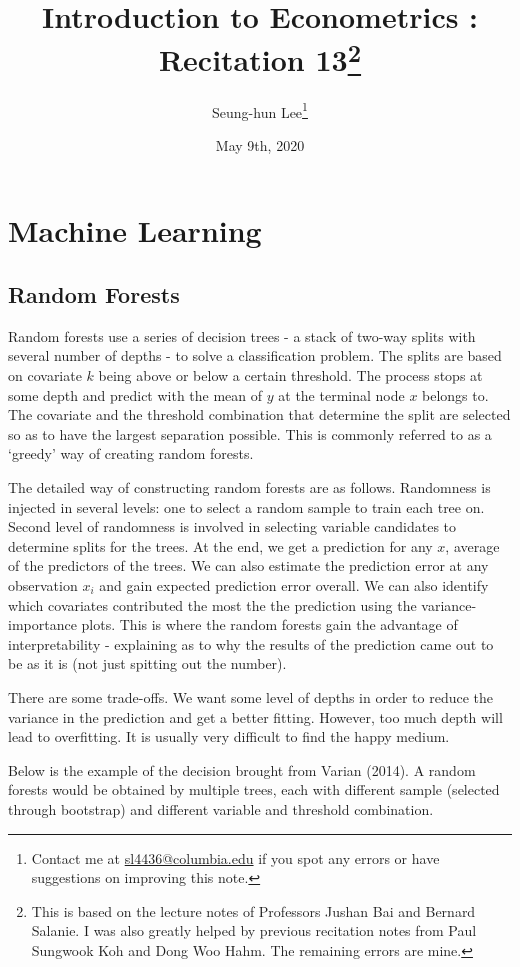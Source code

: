 \documentclass[12pt]{article}
\title{Introduction to Econometrics \ROM{2}: Recitation 13\footnote{This is based on the lecture notes of Professors Jushan Bai and Bernard Salanie. I was also greatly helped by previous recitation notes from Paul Sungwook Koh and Dong Woo Hahm. The remaining errors are mine. }}
\theoremstyle{definition}
\theoremstyle{property}
\theoremstyle{assumption}
\theoremstyle{example}
\theoremstyle{comment}
\begin{document}
\linespread{1.25}
\onehalfspacing

\author{Seung-hun Lee\footnote{Contact me at \href{mailto:sl4436@columbia.edu}{sl4436@columbia.edu} if you spot any errors or have suggestions on improving this note.}}
\date{May 9th, 2020}
\maketitle
\thispagestyle{firstpage}

\section{Machine Learning}
\subsection{Random Forests}
Random forests use a series of decision trees - a stack of two-way splits with several number of depths - to solve a classification problem. The splits are based on covariate $k$ being above or below a certain threshold. The process stops at some depth and predict with the mean of $y$ at the terminal node $x$ belongs to. The covariate and the threshold combination that determine the split are selected so as to have the largest separation possible. This is commonly referred to as a `greedy' way of creating random forests.  \par
The detailed way of constructing random forests are as follows. Randomness is injected in several levels: one to select a random sample to train each tree on. Second level of randomness is involved in selecting variable candidates to determine splits for the trees. At the end, we get a prediction for any $x$, average of the predictors of the trees. We can also estimate the prediction error at any observation $x_i$ and gain expected prediction error overall. We can also identify which covariates contributed the most the the prediction using the variance-importance plots. This is where the random forests gain the advantage of interpretability - explaining as to why the results of the prediction came out to be as it is (not just spitting out the number). \par
There are some trade-offs. We want some level of depths in order to reduce the variance in the prediction and get a better fitting. However, too much depth will lead to overfitting. It is usually very difficult to find the happy medium. \par
Below is the example of the decision brought from Varian (2014). A random forests would be obtained by multiple trees, each with different sample (selected through bootstrap) and different variable and threshold combination. 
\end{document}
